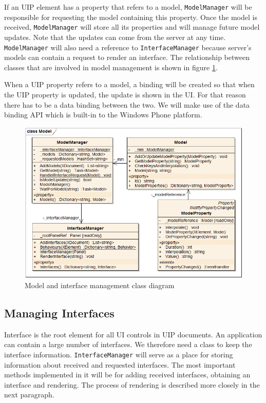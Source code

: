 If an UIP element has a property that refers to a model, \texttt{ModelManager} will be responsible for requesting the model containing this property. Once the model is received, \texttt{ModelManager} will store all its properties and will manage future model updates. Note that the updates can come from the server at any time. \texttt{ModelManager} will also need a reference to \texttt{InterfaceManager} because server's models can contain a request to render an interface. The relationship between classes that are involved in model management is shown in figure \ref{fig:classModel}.

When a UIP property refers to a model, a binding will be created so that when the UIP property is updated, the update is shown in the UI. For that reason there has to be a data binding between the two. We will make use of the data binding API which is built-in to the Windows Phone platform.

\begin{figure}[ht!]
\centering
\includegraphics[width=145mm]{pics/3/classModel.png}
\caption{Model and interface management class diagram}
\label{fig:classModel}
\end{figure}

\subsection{Managing Interfaces}
Interface is the root element for all UI controls in UIP documents. An application can contain a large number of interfaces. We therefore need a class to keep the interface information. \texttt{InterfaceManager} will serve as a place for storing information about received and requested interfaces. The most important methods implemented in it will be for adding received interfaces, obtaining an interface and rendering. The process of rendering is described more closely in the next paragraph.

